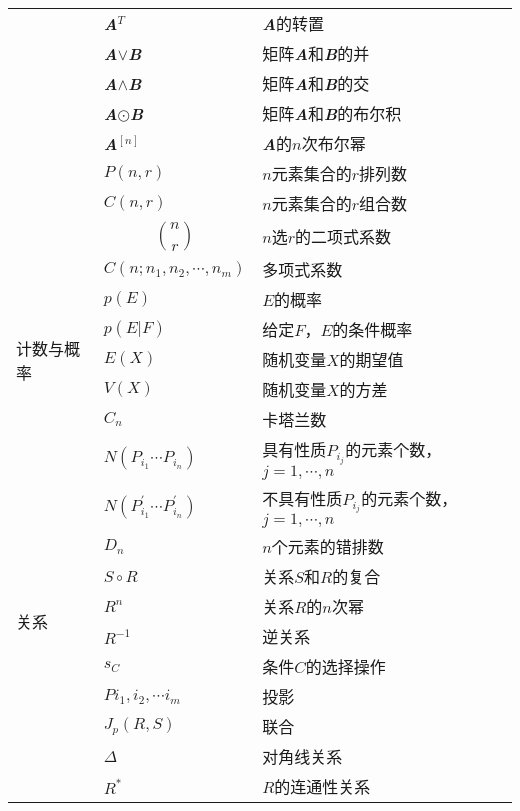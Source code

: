 \documentclass[UTF8]{ctexart}
\begin{document}
\begin{longtable}{|p{9em}|p{15em}|p{15em}|}
  \cline{2-3}
    & \textbf{\textit{A}}$^T$& \textbf{\textit{A}}的转置\\
  \cline{2-3}
    & \textbf{\textit{A}}$\vee$\textbf{\textit{B}}& 矩阵\textbf{\textit{A}}和\textbf{\textit{B}}的并\\
  \cline{2-3}
    & \textbf{\textit{A}}$\wedge$\textbf{\textit{B}}& 矩阵\textbf{\textit{A}}和\textbf{\textit{B}}的交\\
  \cline{2-3}
    & \textbf{\textit{A}}$\odot$\textbf{\textit{B}}& 矩阵\textbf{\textit{A}}和\textbf{\textit{B}}的布尔积\\
  \cline{2-3}
    & \textbf{\textit{A}}$^{[n]}$& \textbf{\textit{A}}的$n$次布尔幂\\
  \hline
  \multirow{12}{9em}{计数与概率} & $P(n, r)$ & $n$元素集合的$r$排列数\\
  \cline{2-3}
    & $C(n, r)$ & $n$元素集合的$r$组合数\\
  \cline{2-3}
    & $$\binom{n}{r}$$& $n$选$r$的二项式系数\\
  \cline{2-3}
    & $C(n;n_1,n_2,\cdots ,n_m)$& 多项式系数\\
  \cline{2-3}
    & $p(E)$& $E$的概率\\
  \cline{2-3}
    & $p(E|F)$& 给定$F$，$E$的条件概率\\
  \cline{2-3}
    & $E(X)$& 随机变量$X$的期望值\\
  \cline{2-3}
    & $V(X)$& 随机变量$X$的方差\\
  \cline{2-3}
    & $C_n$& 卡塔兰数\\
  \cline{2-3}
    & $N(P_{i_1}\cdots P_{i_n})$& 具有性质$P_{i_j}$的元素个数，$j=1,\cdots ,n$\\
  \cline{2-3}
    & $N(P^{'}_{i_1}\cdots P^{'}_{i_n})$& 不具有性质$P_{i_j}$的元素个数，$j=1,\cdots ,n$\\
  \cline{2-3}
    & $D_n$& $n$个元素的错排数\\
  \hline
  \multirow{4}{9em}{关系} & $S\circ R$ & 关系$S$和$R$的复合\\
  \cline{2-3}
    & $R^n$& 关系$R$的$n$次幂\\
  \cline{2-3}
    & $R^{-1}$& 逆关系\\
  \cline{2-3}
    & $s_C$& 条件$C$的选择操作\\
  \cline{2-3}
    & $Pi_1,i_2,\cdots i_m$& 投影\\
  \cline{2-3}
    & $J_p(R, S)$& 联合\\
  \cline{2-3}
    & $\Delta$& 对角线关系\\
  \cline{2-3}
    & $R^*$& $R$的连通性关系\\

\end{longtable}
\end{document}
